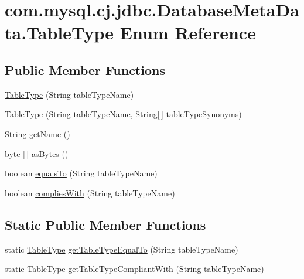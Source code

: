 \hypertarget{enumcom_1_1mysql_1_1cj_1_1jdbc_1_1_database_meta_data_1_1_table_type}{}\section{com.\+mysql.\+cj.\+jdbc.\+Database\+Meta\+Data.\+Table\+Type Enum Reference}
\label{enumcom_1_1mysql_1_1cj_1_1jdbc_1_1_database_meta_data_1_1_table_type}
\subsection*{Public Member Functions}
\begin{DoxyCompactItemize}
\item 
\mbox{\hyperlink{enumcom_1_1mysql_1_1cj_1_1jdbc_1_1_database_meta_data_1_1_table_type_aa8322d99d6c5dfebf2d447a31ef547ff}{Table\+Type}} (String table\+Type\+Name)
\item 
\mbox{\hyperlink{enumcom_1_1mysql_1_1cj_1_1jdbc_1_1_database_meta_data_1_1_table_type_aacfc9c6cda58975d253c3ddf9fa4af88}{Table\+Type}} (String table\+Type\+Name, String\mbox{[}$\,$\mbox{]} table\+Type\+Synonyms)
\item 
String \mbox{\hyperlink{enumcom_1_1mysql_1_1cj_1_1jdbc_1_1_database_meta_data_1_1_table_type_aa587977cc6bd567eb090ae5d56896d8d}{get\+Name}} ()
\item 
byte \mbox{[}$\,$\mbox{]} \mbox{\hyperlink{enumcom_1_1mysql_1_1cj_1_1jdbc_1_1_database_meta_data_1_1_table_type_a774da2fff100b7f47ebc4f0a3f29d438}{as\+Bytes}} ()
\item 
boolean \mbox{\hyperlink{enumcom_1_1mysql_1_1cj_1_1jdbc_1_1_database_meta_data_1_1_table_type_a84a6c6e9c3ef798eab51af6c951d883e}{equals\+To}} (String table\+Type\+Name)
\item 
boolean \mbox{\hyperlink{enumcom_1_1mysql_1_1cj_1_1jdbc_1_1_database_meta_data_1_1_table_type_a8c7797c022a5fd854ea2e72299021af8}{complies\+With}} (String table\+Type\+Name)
\end{DoxyCompactItemize}
\subsection*{Static Public Member Functions}
\begin{DoxyCompactItemize}
\item 
static \mbox{\hyperlink{enumcom_1_1mysql_1_1cj_1_1jdbc_1_1_database_meta_data_1_1_table_type}{Table\+Type}} \mbox{\hyperlink{enumcom_1_1mysql_1_1cj_1_1jdbc_1_1_database_meta_data_1_1_table_type_a391582bd53d82ef2e57ebdb19971e173}{get\+Table\+Type\+Equal\+To}} (String table\+Type\+Name)
\item 
static \mbox{\hyperlink{enumcom_1_1mysql_1_1cj_1_1jdbc_1_1_database_meta_data_1_1_table_type}{Table\+Type}} \mbox{\hyperlink{enumcom_1_1mysql_1_1cj_1_1jdbc_1_1_database_meta_data_1_1_table_type_a2c1b0ce40bf2e762ff2dc94c62642242}{get\+Table\+Type\+Compliant\+With}} (String table\+Type\+Name)
\end{DoxyCompactItemize}
